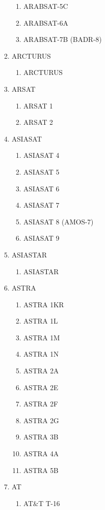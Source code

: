 \begin{multicols}{2}
\begin{enumerate}
\begin{enumerate}
    \item ARABSAT-5C
    \item ARABSAT-6A
    \item ARABSAT-7B (BADR-8)
  \end{enumerate}
  \item ARCTURUS
  \begin{enumerate}
    \item ARCTURUS
  \end{enumerate}
  \item ARSAT
  \begin{enumerate}
    \item ARSAT 1
    \item ARSAT 2
  \end{enumerate}
  \item ASIASAT
  \begin{enumerate}
    \item ASIASAT 4
    \item ASIASAT 5
    \item ASIASAT 6
    \item ASIASAT 7
    \item ASIASAT 8 (AMOS-7)
    \item ASIASAT 9
  \end{enumerate}
  \item ASIASTAR
  \begin{enumerate}
    \item ASIASTAR
  \end{enumerate}
  \item ASTRA
  \begin{enumerate}
    \item ASTRA 1KR
    \item ASTRA 1L
    \item ASTRA 1M
    \item ASTRA 1N
    \item ASTRA 2A
    \item ASTRA 2E
    \item ASTRA 2F
    \item ASTRA 2G
    \item ASTRA 3B
    \item ASTRA 4A
    \item ASTRA 5B
  \end{enumerate}
  \item AT
  \begin{enumerate}
    \item AT\&T T-16
  \end{enumerate}

\end{enumerate}
\end{multicols}
